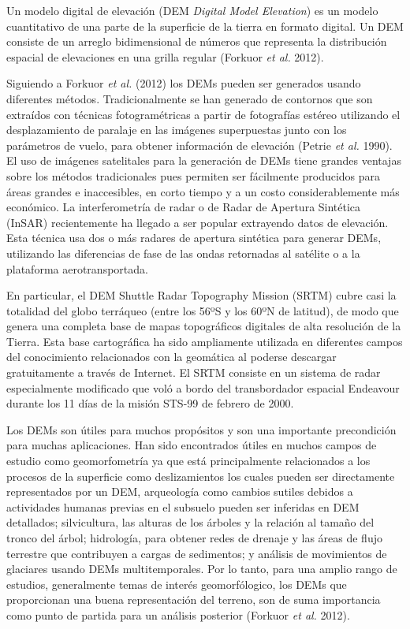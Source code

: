 \documentclass[10pt,a4paper, twoside]{report}
\begin{document}
Un modelo digital de elevación (DEM \textit{Digital Model Elevation}) es un modelo cuantitativo de una parte de la superficie de la tierra en formato digital. Un DEM consiste de un arreglo bidimensional  de números que representa la distribución espacial de elevaciones en una grilla regular (Forkuor \textit{et al.} 2012).

Siguiendo a Forkuor \textit{et al.} (2012) los DEMs pueden ser generados usando diferentes métodos. Tradicionalmente se han generado de contornos que son extraídos con técnicas fotogramétricas a partir de fotografías estéreo utilizando el desplazamiento de paralaje en las imágenes superpuestas junto con los parámetros de vuelo, para obtener información de elevación (Petrie \textit{et al.} 1990). El uso de imágenes satelitales para la generación de DEMs tiene grandes ventajas sobre los métodos tradicionales pues permiten ser fácilmente producidos para áreas grandes e inaccesibles, en corto tiempo y a un costo considerablemente más económico. La interferometría de radar o de Radar de Apertura Sintética (InSAR) recientemente ha llegado a ser popular extrayendo datos de elevación. Esta técnica usa dos o más radares de apertura sintética para generar DEMs, utilizando las diferencias de fase de las ondas retornadas al satélite o a la plataforma aerotransportada.

En particular, el DEM Shuttle Radar Topography Mission (SRTM) cubre casi la totalidad del globo terráqueo (entre los 56ºS y los 60ºN de latitud), de modo que genera una completa base de mapas topográficos digitales de alta resolución de la Tierra. Esta base cartográfica ha sido ampliamente utilizada en diferentes campos del conocimiento relacionados con la geomática al poderse descargar gratuitamente a través de Internet. El SRTM consiste en un sistema de radar especialmente modificado que voló a bordo del transbordador espacial Endeavour durante los 11 días de la misión STS-99 de febrero de 2000.

Los DEMs son útiles para muchos propósitos y son una importante precondición para muchas aplicaciones. Han sido encontrados útiles en muchos campos de estudio como geomorfometría ya que está principalmente relacionados a los procesos de la superficie como deslizamientos los cuales pueden ser directamente representados por un DEM, arqueología como cambios sutiles debidos a actividades humanas previas en el subsuelo pueden ser inferidas en DEM detallados; silvicultura, las alturas de los árboles y la relación al tamaño del tronco del árbol; hidrología, para obtener redes de drenaje y las áreas de flujo terrestre que contribuyen a cargas de sedimentos; y análisis de movimientos de glaciares usando DEMs multitemporales. Por lo tanto, para una amplio rango de estudios, generalmente temas de interés geomorfólogico, los DEMs que proporcionan una buena representación del terreno, son de suma importancia como punto de partida para un análisis posterior (Forkuor \textit{et al.} 2012).
\end{document}

